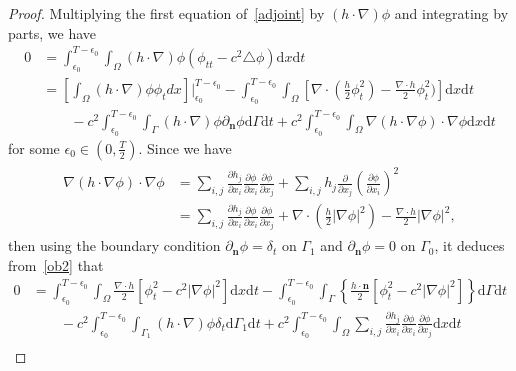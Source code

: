 \documentclass[10pt]{elsarticle}
\begin{document}
\begin{proof}
Multiplying the first equation of~\eqref{adjoint} by $(h\cdot\nabla) \phi$ and integrating by parts, we have
\begin{equation}
\begin{split}\label{ob2}
	0&=\int_{\epsilon_0}^{T-\epsilon_0}\int_{\Omega}(h\cdot\nabla) \phi ( \phi_{tt}  -c^2\triangle \phi)\mathrm{d}x\mathrm{d}t \\
	&=\left[\int_{\Omega}(h\cdot\nabla) \phi  \phi_{t} dx\right]\bigg|_{\epsilon_0}^{T-\epsilon_0}-\int_{\epsilon_0}^{T-\epsilon_0}\int_{\Omega}\left[\nabla\cdot(\frac{h}{2} \phi_{t}^2)-\frac{\nabla\cdot h}{2} \phi_{t}^2)\right]\mathrm{d}x\mathrm{d}t\\
	&\qquad-c^2\int_{\epsilon_0}^{T-\epsilon_0}\int_{\Gamma}(h\cdot\nabla) \phi{\partial_{ \mathbf{n}}\phi}\mathrm{d}\Gamma\mathrm{ d}t+c^2\int_{\epsilon_0}^{T-\epsilon_0}\int_{\Omega}\nabla(h\cdot\nabla \phi)\cdot \nabla\phi \mathrm{d}x\mathrm{d}t
\end{split}
\end{equation}
for some $\epsilon_0\in(0, \frac{T}{2})$. Since we have
\begin{eqnarray*}
\begin{split}
	\nabla(h\cdot\nabla \phi)\cdot \nabla\phi &= \sum_{i, j}\frac{\partial h_j}{\partial x_i}\frac{\partial\phi}{\partial x_i}\frac{\partial\phi}{\partial x_j} + \sum_{i, j}h_j\frac{\partial}{\partial x_j}\left(\frac{\partial\phi}{\partial x_i}\right)^2\\
	&= \sum_{i, j}\frac{\partial h_j}{\partial x_i}\frac{\partial\phi}{\partial x_i}\frac{\partial\phi}{\partial x_j} + \nabla\cdot\left(\frac{h}{2}|\nabla\phi|^2\right)-\frac{\nabla\cdot h}{2}|\nabla\phi|^2,
\end{split}
\end{eqnarray*}
then using the boundary condition $\partial_{ \mathbf{n}}\phi = \delta_t$ on $\Gamma_1$ and $\partial_{ \mathbf{n}}\phi = 0$ on $\Gamma_0$, it deduces from~\eqref{ob2} that
\begin{equation}\label{ob2_1}
\begin{split}
	0&=\int_{\epsilon_0}^{T-\epsilon_0}\int_{\Omega}\frac{\nabla\cdot h}{2}[\phi_t^2-c^2|\nabla\phi|^2] \mathrm{d}x\mathrm{d}t-\int_{\epsilon_0}^{T-\epsilon_0}\int_{\Gamma}\left\{\frac{h\cdot\mathbf{n}}{2}[\phi_t^2-c^2|\nabla\phi|^2]\right\}\mathrm{d}\Gamma \mathrm{d}t\\
	&\qquad -c^2\int_{\epsilon_0}^{T-\epsilon_0}\int_{\Gamma_1}(h\cdot\nabla) \phi\delta_t \mathrm{d}\Gamma_1 \mathrm{d}t+c^2\int_{\epsilon_0}^{T-\epsilon_0}\int_{\Omega}\sum_{i, j}\frac{\partial h_j}{\partial x_i}\frac{\partial\phi}{\partial x_i}\frac{\partial\phi}{\partial x_j} \mathrm{d}x\mathrm{d}t\\

\end{split}
\end{equation}
\end{proof}
\end{document}
